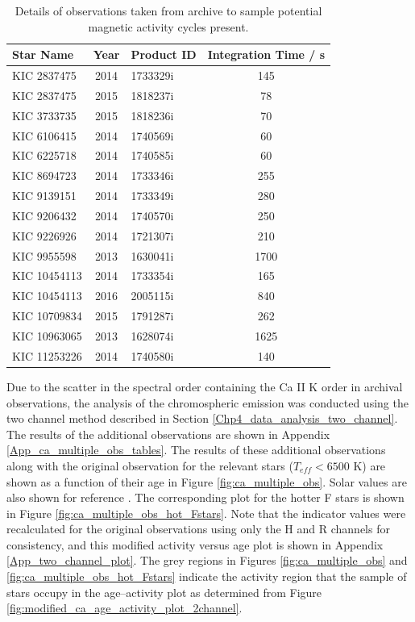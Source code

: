 \begin{table}
\centering
\begin{tabular}{lclc}
\hline
Star Name    & Year & Product ID & Integration Time / s \\
\hline
KIC 2837475  & 2014 & 1733329i   & 145                  \\
KIC 2837475  & 2015 & 1818237i   & 78                   \\
KIC 3733735  & 2015 & 1818236i   & 70                   \\
KIC 6106415  & 2014 & 1740569i   & 60                   \\
KIC 6225718  & 2014 & 1740585i   & 60                   \\
KIC 8694723  & 2014 & 1733346i   & 255                  \\
KIC 9139151  & 2014 & 1733349i   & 280                  \\
KIC 9206432  & 2014 & 1740570i   & 250                  \\
KIC 9226926  & 2014 & 1721307i   & 210                  \\
KIC 9955598  & 2013 & 1630041i   & 1700                 \\
KIC 10454113 & 2014 & 1733354i   & 165                  \\
KIC 10454113 & 2016 & 2005115i   & 840                  \\
KIC 10709834 & 2015 & 1791287i   & 262                  \\
KIC 10963065 & 2013 & 1628074i   & 1625                 \\
KIC 11253226 & 2014 & 1740580i   & 140					\\
\hline
\end{tabular}
\caption[Details of archival \esp observations]{Details of observations taken from \esp archive to sample potential magnetic activity cycles present.}
\label{Table:esp_additional_obs_table}
\end{table}

Due to the scatter in the spectral order containing the Ca II K order in archival observations, the analysis of the chromospheric emission was conducted using the two channel method described in Section \ref{Chp4_data_analysis_two_channel}. The results of the additional observations are shown in Appendix \ref{App_ca_multiple_obs_tables}. The results of these additional observations along with the original observation for the relevant stars ($T_{eff} < 6500$ K) are shown as a function of their age in Figure \ref{fig:ca_multiple_obs}. Solar values are also shown for reference \citep{Egeland_etal_2017}. The corresponding plot for the hotter F stars is shown in Figure \ref{fig:ca_multiple_obs_hot_Fstars}. Note that the \Rprime indicator values were recalculated for the original observations using only the H and R channels for consistency, and this modified activity versus age plot is shown in Appendix \ref{App_two_channel_plot}. The grey regions in Figures \ref{fig:ca_multiple_obs} and \ref{fig:ca_multiple_obs_hot_Fstars} indicate the activity region that the sample of stars occupy in the age--activity plot as determined from Figure \ref{fig:modified_ca_age_activity_plot_2channel}.

